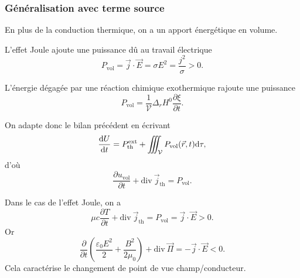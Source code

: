         \subsubsection{Généralisation avec terme source}

            En plus de la conduction thermique, on a un apport énergétique en volume.

            \begin{example}
                L'effet Joule ajoute une puissance dû au travail électrique
                \begin{equation*}
                    P_{\text{vol}}=\vec{j}\cdot\vec{E}=\sigma E^{2}=\frac{j^{2}}{\sigma}>0.
                \end{equation*}
            \end{example}
            \begin{example}
                L'énergie dégagée par une réaction chimique exothermique rajoute une puissance
                \begin{equation*}
                    P_{\text{vol}}=\frac{1}{\mathcal{V}}\Delta_r H^{0}\frac{\partial\xi}{\partial t}.
                \end{equation*}
            \end{example}

            On adapte donc le bilan précédent en écrivant
            \begin{equation*}
                \frac{\mathrm{d} U}{\mathrm{d} t}=P_{\text{th}}^{\text{ext}}+\iiint_{\mathcal{V}}P_{\text{vol}}(\vec{r},t)\mathrm{d}\tau,
            \end{equation*}
            d'où
            \begin{equation*}
                \boxed{
                    \frac{\partial u_{\text{vol}}}{\partial t}+\mathrm{div}~\vec{j}_{\text{th}}=P_{\text{vol}}.
                }
            \end{equation*}

            \begin{example}
                Dans le cas de l'effet Joule, on a 
                \begin{equation*}
                    \mu c\frac{\partial T}{\partial t}+\mathrm{div}~\vec{j}_{\text{th}}=P_{\text{vol}}=\vec{j}\cdot\vec{E}>0.
                \end{equation*}
                Or 
                \begin{equation*}
                    \frac{\partial}{\partial t}\left(\frac{\varepsilon_{0}E^{2}}{2}+\frac{B^{2}}{2\mu_0}\right)+\mathrm{div}~\vec{\Pi}=-\vec{j}\cdot\vec{E}<0.
                \end{equation*}
                Cela caractérise le changement de point de vue champ/conducteur.
            \end{example}

